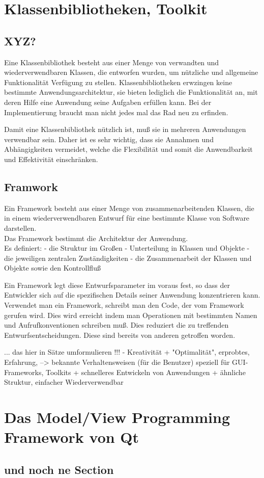 \documentclass[11pt,a4paper,titlepage]{scrreprt}
\begin{document}
\chapter{Klassenbibliotheken, Toolkit}
\section{XYZ?}
Eine Klassenbibliothek besteht aus einer Menge von verwandten und wiederverwendbaren Klassen,
die entworfen wurden, um nützliche und allgemeine Funktionalität Verfügung zu stellen.
Klassenbibliotheken erwzingen keine bestimmte Anwendungsarchitektur, sie bieten lediglich die
Funktionalität an, mit deren Hilfe eine Anwendung seine Aufgaben erfüllen kann. Bei der
Implementierung braucht man nicht jedes mal das Rad neu zu erfinden.

Damit eine Klassenbibliothek nützlich ist, muß sie in mehreren Anwendungen verwendbar sein.
Daher ist es sehr wichtig, dass sie Annahmen und Abhängigkeiten vermeidet, welche die Flexibilität
und somit die Anwendbarkeit und Effektivität einschränken.

\section{Framwork}
Ein Framework besteht aus einer Menge von zusammenarbeitenden Klassen, die in einem
wiederverwendbaren Entwurf für eine bestimmte Klasse von Software darstellen.\\
Das Framework bestimmt die Architektur der Anwendung.\\
Es definiert:
	- die Struktur im Großen
	- Unterteilung in Klassen und Objekte
	- die jeweiligen zentralen Zuständigkeiten
	- die Zusammenarbeit der Klassen und Objekte sowie den Kontrollfluß

Ein Framework legt diese Entwurfsparameter im voraus fest, so dass der Entwickler
sich auf die spezifischen Details seiner Anwendung konzentrieren kann.\\
Verwendet man ein Framework, schreibt man den Code, der vom Framework gerufen wird.
Dies wird erreicht indem man Operationen mit bestimmten Namen und Aufrufkonventionen
schreiben muß. Dies reduziert die zu treffenden Entwurfsentscheidungen. Diese sind
bereits von anderen getroffen worden.

... das hier in Sätze umformulieren !!!
 - Kreativität
 + "Optimalität", erprobtes, Erfahrung, --> bekannte Verhaltensweisen (für die Benutzer)
 speziell für GUI-Frameworks, Toolkits
 + schnelleres Entwickeln von Anwendungen
 + ähnliche Struktur, einfacher Wiederverwendbar

\chapter{Das Model/View Programming Framework von Qt}
\section{und noch ne Section}
\end{document}
